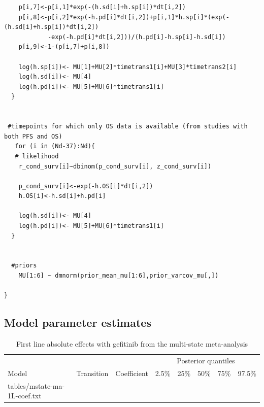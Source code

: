 \documentclass[11pt,final,fleqn]{article}\usepackage[]{graphicx}\usepackage[]{color}
\makeatletter
\theoremstyle{plain}
\newcommand*\ExpandableInput[1]{\@@input#1 }
\makeatother
\begin{document}
\begin{appendices}
\begin{verbatim}
    p[i,7]<-p[i,1]*exp(-(h.sd[i]+h.sp[i])*dt[i,2])
    p[i,8]<-p[i,2]*exp(-h.pd[i]*dt[i,2])+p[i,1]*h.sp[i]*(exp(-(h.sd[i]+h.sp[i])*dt[i,2])
    		-exp(-h.pd[i]*dt[i,2]))/(h.pd[i]-h.sp[i]-h.sd[i])
    p[i,9]<-1-(p[i,7]+p[i,8])
    
    log(h.sp[i])<- MU[1]+MU[2]*timetrans1[i]+MU[3]*timetrans2[i] 
    log(h.sd[i])<- MU[4] 
    log(h.pd[i])<- MU[5]+MU[6]*timetrans1[i]
  }
  
  
 #timepoints for which only OS data is available (from studies with both PFS and OS)
   for (i in (Nd-37):Nd){
   # likelihood
    r_cond_surv[i]~dbinom(p_cond_surv[i], z_cond_surv[i]) 
    
    p_cond_surv[i]<-exp(-h.OS[i]*dt[i,2])
    h.OS[i]<-h.sd[i]+h.pd[i]
    
    log(h.sd[i])<- MU[4]
    log(h.pd[i])<- MU[5]+MU[6]*timetrans1[i]
  }
    
  
  #priors
    MU[1:6] ~ dmnorm(prior_mean_mu[1:6],prior_varcov_mu[,]) 
  
}

\end{verbatim}

\subsection{Model parameter estimates}

\begin{table}[!ht]
\begin{center}
\begin{threeparttable}
\footnotesize
\caption{First line absolute effects with gefitinib from the multi-state meta-analysis} \label{tbl:mstate-ma-1L-coef}
\begin{tabularx}{\textwidth}{@{\extracolsep{\fill}}lllrrrrr}
\hline
\multicolumn{3}{c}{} & \multicolumn{5}{c}{Posterior quantiles} \\
\cmidrule{4-8}
\multicolumn{1}{l}{Model} & \multicolumn{1}{l}{Transition} & \multicolumn{1}{l}{Coefficient}
& \multicolumn{1}{r}{2.5\%} & \multicolumn{1}{r}{25\%} & \multicolumn{1}{r}{50\%} & \multicolumn{1}{r}{75\%} & \multicolumn{1}{r}{97.5\%} \\
\hline
\ExpandableInput{tables/mstate-ma-1L-coef.txt}
\hline
\end{tabularx}
\scriptsize
\end{threeparttable}
\end{center}
\end{table}

\FloatBarrier


\end{appendices}
\end{document}

